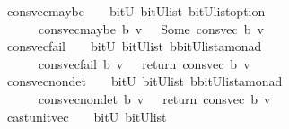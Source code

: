 \begin{isabellebody}
\isanewline
{}\isamarkupfalse%
\ cons{\isacharunderscore}vec{\isacharunderscore}maybe\ \ {\isacharcolon}{\isacharcolon}\ {\isachardoublequoteopen}\ bitU\ {\isasymRightarrow}{\isacharparenleft}bitU{\isacharparenright}list\ {\isasymRightarrow}{\isacharparenleft}{\isacharparenleft}bitU{\isacharparenright}list{\isacharparenright}option\ {\isachardoublequoteclose}\ \ \ \isanewline
\ \ \ \ \ {\isachardoublequoteopen}\ cons{\isacharunderscore}vec{\isacharunderscore}maybe\ b\ v\ {\isacharequal}\ {\isacharparenleft}\ Some\ {\isacharparenleft}cons{\isacharunderscore}vec\ b\ v{\isacharparenright}{\isacharparenright}{\isachardoublequoteclose}\isanewline
\isanewline
{}\isamarkupfalse%
\ cons{\isacharunderscore}vec{\isacharunderscore}fail\ \ {\isacharcolon}{\isacharcolon}\ {\isachardoublequoteopen}\ bitU\ {\isasymRightarrow}{\isacharparenleft}bitU{\isacharparenright}list\ {\isasymRightarrow}{\isacharparenleft}{\isacharprime}b{\isacharcomma}{\isacharparenleft}{\isacharparenleft}bitU{\isacharparenright}list{\isacharparenright}{\isacharcomma}{\isacharprime}a{\isacharparenright}monad\ {\isachardoublequoteclose}\ \ \ \isanewline
\ \ \ \ \ {\isachardoublequoteopen}\ cons{\isacharunderscore}vec{\isacharunderscore}fail\ b\ v\ {\isacharequal}\ {\isacharparenleft}\ return\ {\isacharparenleft}cons{\isacharunderscore}vec\ b\ v{\isacharparenright}{\isacharparenright}{\isachardoublequoteclose}\isanewline
\isanewline
{}\isamarkupfalse%
\ cons{\isacharunderscore}vec{\isacharunderscore}nondet\ \ {\isacharcolon}{\isacharcolon}\ {\isachardoublequoteopen}\ bitU\ {\isasymRightarrow}{\isacharparenleft}bitU{\isacharparenright}list\ {\isasymRightarrow}{\isacharparenleft}{\isacharprime}b{\isacharcomma}{\isacharparenleft}{\isacharparenleft}bitU{\isacharparenright}list{\isacharparenright}{\isacharcomma}{\isacharprime}a{\isacharparenright}monad\ {\isachardoublequoteclose}\ \ \ \isanewline
\ \ \ \ \ {\isachardoublequoteopen}\ cons{\isacharunderscore}vec{\isacharunderscore}nondet\ b\ v\ {\isacharequal}\ {\isacharparenleft}\ return\ {\isacharparenleft}cons{\isacharunderscore}vec\ b\ v{\isacharparenright}{\isacharparenright}{\isachardoublequoteclose}\isanewline
\isanewline
\isanewline
%
\isanewline
{}\isamarkupfalse%
\ cast{\isacharunderscore}unit{\isacharunderscore}vec\ \ {\isacharcolon}{\isacharcolon}\ {\isachardoublequoteopen}\ bitU\ {\isasymRightarrow}{\isacharparenleft}bitU{\isacharparenright}list\ {\isachardoublequoteclose}\ \ \ \isanewline

\end{isabellebody}
